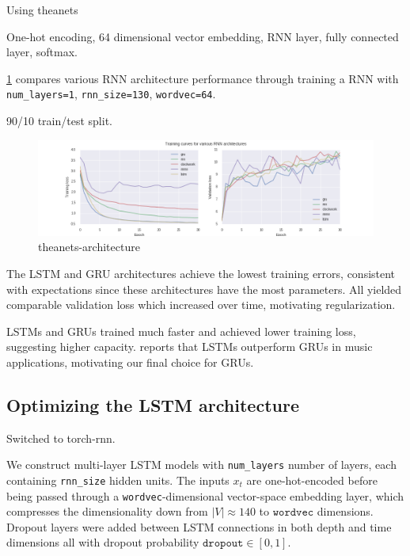 Using theanets

One-hot encoding, 64 dimensional vector embedding, RNN layer, fully connected layer, softmax.

\cref{fig:theanets-architecture} compares various RNN architecture performance
through training a RNN with \texttt{num\_layers=1}, \texttt{rnn\_size=130},
\texttt{wordvec=64}.

90/10 train/test split.

\begin{figure}[htpb]
    \centering
    \includegraphics[width=\linewidth]{theanets-architecture.png}
    \caption{theanets-architecture}
    \label{fig:theanets-architecture}
\end{figure}

The LSTM and GRU architectures achieve the lowest training errors, consistent with expectations
since these architectures have the most parameters.
All yielded comparable validation loss which increased over time, motivating regularization.

LSTMs and GRUs trained much faster and achieved lower training loss, suggesting higher capacity.
\citep{Nayebi2015} reports that LSTMs outperform GRUs in music applications, motivating
our final choice for GRUs.

\subsection{Optimizing the LSTM architecture}

Switched to torch-rnn. 

We construct multi-layer LSTM models with \texttt{num\_layers} number of
layers, each containing \texttt{rnn\_size} hidden units. The inputs $x_t$ are
one-hot-encoded before being passed through a \texttt{wordvec}-dimensional
vector-space embedding layer, which compresses the dimensionality down from
$|V| \approx 140$ to $\texttt{wordvec}$ dimensions. Dropout layers were added
between LSTM connections in both depth and time dimensions all with dropout
probability $\texttt{dropout} \in [0,1]$.


